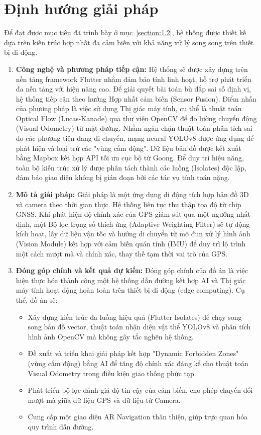 \documentclass[../DoAn.tex]{subfiles}
\begin{document}
\section{Định hướng giải pháp}
\label{section:1.3}

Để đạt được mục tiêu đã trình bày ở mục~\ref{section:1.2}, hệ thống được thiết kế dựa trên kiến trúc hợp nhất đa cảm biến với khả năng xử lý song song trên thiết bị di động. 

\begin{enumerate}
    \item [(i)] \textbf{Công nghệ và phương pháp tiếp cận:}
    Hệ thống sẽ được xây dựng trên nền tảng framework Flutter nhằm đảm bảo tính linh hoạt, hỗ trợ phát triển đa nền tảng với hiệu năng cao. Để giải quyết bài toán bù đắp sai số định vị, hệ thống tiếp cận theo hướng Hợp nhất cảm biến (Sensor Fusion). Điểm nhấn của phương pháp là việc sử dụng Thị giác máy tính, cụ thể là thuật toán Optical Flow (Lucas-Kanade) qua thư viện OpenCV để đo lường chuyển động (Visual Odometry) từ mặt đường. Nhằm ngăn chặn thuật toán phân tích sai do các phương tiện đang di chuyển, mạng neural YOLOv8 được ứng dụng để phát hiện và loại trừ các "vùng cấm động". Dữ liệu bản đồ được kết xuất bằng Mapbox kết hợp API tối ưu cục bộ từ Goong. Để duy trì hiệu năng, toàn bộ kiến trúc xử lý được phân tách thành các luồng (Isolates) độc lập, đảm bảo giao diện không bị gián đoạn bởi các tác vụ tính toán nặng.
    
    \item [(ii)] \textbf{Mô tả giải pháp:}
    Giải pháp là một ứng dụng di động tích hợp bản đồ 3D và camera theo thời gian thực. Hệ thống liên tục thu thập tọa độ từ chip GNSS. Khi phát hiện độ chính xác của GPS giảm sút qua một ngưỡng nhất định, một Bộ lọc trọng số thích ứng (Adaptive Weighting Filter) sẽ tự động kích hoạt, lấy dữ liệu vận tốc và hướng di chuyển từ mô đun xử lý hình ảnh (Vision Module) kết hợp với cảm biến quán tính (IMU) để duy trì lộ trình một cách mượt mà và chính xác, thay thế tạm thời vai trò của GPS.

    \item [(iii)] \textbf{Đóng góp chính và kết quả dự kiến:}
    Đóng góp chính của đồ án là việc hiện thực hóa thành công một hệ thống dẫn đường kết hợp AI và Thị giác máy tính hoạt động hoàn toàn trên thiết bị di động (edge computing). Cụ thể, đồ án sẽ:
    \begin{itemize}
        \item Xây dựng kiến trúc đa luồng hiệu quả (Flutter Isolates) để chạy song song bản đồ vector, thuật toán nhận diện vật thể YOLOv8 và phân tích hình ảnh OpenCV mà không gây tắc nghẽn hệ thống.
        \item Đề xuất và triển khai giải pháp kết hợp "Dynamic Forbidden Zones" (vùng cấm động) bằng AI để tăng độ chính xác đáng kể cho thuật toán Visual Odometry trong điều kiện giao thông phức tạp.
        \item Phát triển bộ lọc đánh giá độ tin cậy của cảm biến, cho phép chuyển đổi mượt mà giữa dữ liệu GPS và dữ liệu từ Camera.
        \item Cung cấp một giao diện AR Navigation thân thiện, giúp trực quan hóa quy trình dẫn đường.
    \end{itemize}


\end{enumerate}
\end{document}

